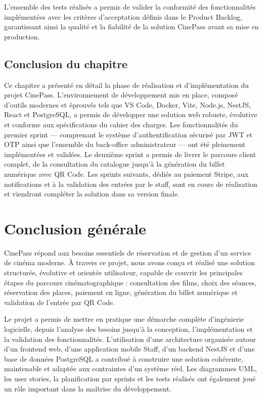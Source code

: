 \documentclass[12pt]{report}
\begin{document}
L'ensemble des tests réalisés a permis de valider la
conformité des fonctionnalités implémentées avec les
critères d'acceptation définis dans le Product Backlog,
garantissant ainsi la qualité et la fiabilité de la
solution CinePass avant sa mise en production.
\section{Conclusion du chapitre}

Ce chapitre a présenté en détail la phase de réalisation et d'implémentation du projet CinePass. L'environnement de développement mis en place, composé d'outils modernes et éprouvés tels que VS Code, Docker, Vite, Node.js, NestJS, React et PostgreSQL, a permis de développer une solution web robuste, évolutive et conforme aux spécifications du cahier des charges. Les fonctionnalités du premier sprint — comprenant le système d'authentification sécurisé par JWT et OTP ainsi que l'ensemble du back-office administrateur — ont été pleinement implémentées et validées. Le deuxième sprint a permis de livrer le parcours client complet, de la consultation du catalogue jusqu'à la génération du billet numérique avec QR Code. Les sprints suivants, dédiés au paiement Stripe, aux notifications et à la validation des entrées par le staff, sont en cours de réalisation et viendront compléter la solution dans sa version finale.

\chapter*{Conclusion générale}
CinePass répond aux besoins essentiels de réservation et de gestion d'un service de cinéma moderne. À travers ce projet, nous avons conçu et réalisé une solution structurée, évolutive et orientée utilisateur, capable de couvrir les principales étapes du parcours cinématographique : consultation des films, choix des séances, réservation des places, paiement en ligne, génération du billet numérique et validation de l'entrée par QR Code.

Le projet a permis de mettre en pratique une démarche complète d'ingénierie logicielle, depuis l'analyse des besoins jusqu'à la conception, l'implémentation et la validation des fonctionnalités. L'utilisation d'une architecture organisée autour d'un frontend web, d'une application mobile Staff, d'un backend NestJS et d'une base de données PostgreSQL a contribué à construire une solution cohérente, maintenable et adaptée aux contraintes d'un système réel. Les diagrammes UML, les user stories, la planification par sprints et les tests réalisés ont également joué un rôle important dans la maîtrise du développement.
\end{document}
